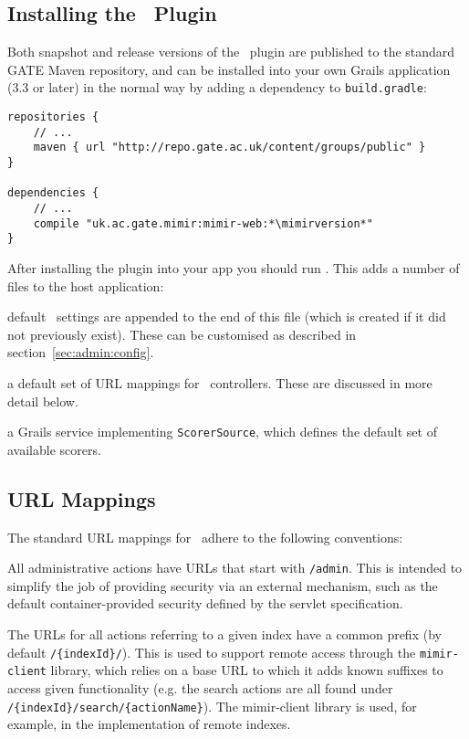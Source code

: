 \subsection{Installing the \Mimir\ Plugin}

Both snapshot and release versions of the \Mimir\ plugin are published to
the standard GATE Maven repository, and can be installed into your own
Grails application (3.3 or later) in the normal way by adding a dependency
to {\tt build.gradle}:
\begin{lstlisting}[escapechar=*]
repositories {
    // ...
    maven { url "http://repo.gate.ac.uk/content/groups/public" }
}

dependencies {
    // ...
    compile "uk.ac.gate.mimir:mimir-web:*\mimirversion*"
}
\end{lstlisting}

After installing the plugin into your app you should run
.  This adds a number of files to the host
application:

\bde
\item[grails-app/conf/application.groovy] default \Mimir\ settings are appended
  to the end of this file (which is created if it did not previously exist).
  These can be customised as described in section~\ref{sec:admin:config}.
\item[grails-app/controllers/(default package)/MimirUrlMappings.groovy] a
  default set of URL mappings for \Mimir\ controllers.  These are discussed in
  more detail below.
\item[grails-app/services/(default package)/MimirScorerService.groovy] a
  Grails service implementing {\tt ScorerSource}, which defines the default
  set of available scorers.
\ede

\subsection{URL Mappings}

The standard URL mappings for \Mimir\ adhere to the following conventions:
\bit
  \item All administrative actions have URLs that start with {\tt /admin}. This
  is intended to simplify the job of providing security via an external
  mechanism, such as the default container-provided security defined by the
  servlet specification.
  \item The URLs for all actions referring to a given index have a common prefix
  (by default {\tt /\{indexId\}/}). This is used to support remote access
  through the {\tt mimir-client} library, which relies on a base URL to which it
  adds known suffixes to access given functionality (e.g. the search actions
  are all found under {\tt /\{indexId\}/search/\{actionName\}}). The
  mimir-client library is used, for example, in the implementation of remote
  indexes.
\eit

